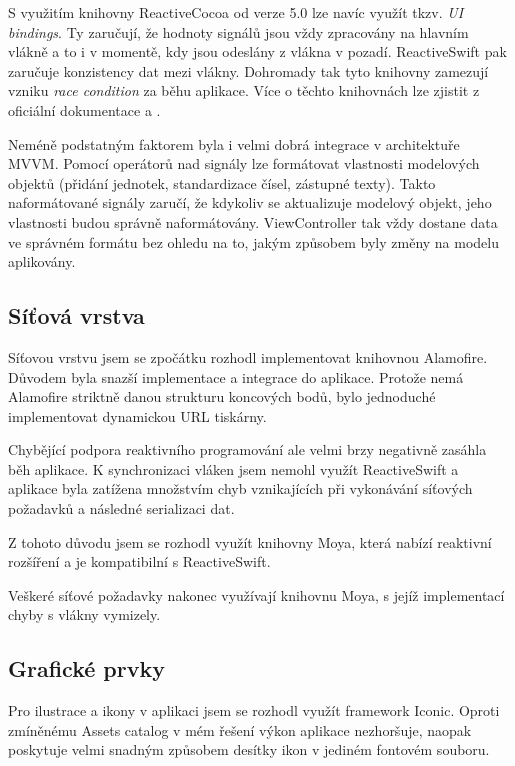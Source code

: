 S využitím knihovny ReactiveCocoa od verze 5.0 lze navíc využít tkzv. \textit{UI bindings}.
Ty zaručují, že hodnoty signálů jsou vždy zpracovány na hlavním vlákně a to i v momentě, kdy jsou odeslány z vlákna v pozadí.
ReactiveSwift pak zaručuje konzistency dat mezi vlákny.
Dohromady tak tyto knihovny zamezují vzniku \textit{race condition} za běhu aplikace.
Více o těchto knihovnách lze zjistit z oficiální dokumentace \cite{github-reactiveswift} a \cite{github-reactivecocoa}.

Neméně podstatným faktorem byla i velmi dobrá integrace v architektuře MVVM.
Pomocí operátorů nad signály lze formátovat vlastnosti modelových objektů (přidání jednotek, standardizace čísel, zástupné texty).
Takto naformátované signály zaručí, že kdykoliv se aktualizuje modelový objekt, jeho vlastnosti budou správně naformátovány.
ViewController tak vždy dostane data ve správném formátu bez ohledu na to, jakým způsobem byly změny na modelu aplikovány.

\subsection{Síťová vrstva}

Síťovou vrstvu jsem se zpočátku rozhodl implementovat knihovnou Alamofire.
Důvodem byla snazší implementace a integrace do aplikace.
Protože nemá Alamofire striktně danou strukturu koncových bodů, bylo jednoduché implementovat dynamickou URL tiskárny.

Chybějící podpora reaktivního programování ale velmi brzy negativně zasáhla běh aplikace.
K synchronizaci vláken jsem nemohl využít ReactiveSwift a aplikace byla zatížena množstvím chyb vznikajících při vykonávání síťových požadavků a následné serializaci dat.

Z tohoto důvodu jsem se rozhodl využít knihovny Moya, která nabízí reaktivní rozšíření a je kompatibilní s ReactiveSwift.

Veškeré síťové požadavky nakonec využívají knihovnu Moya, s jejíž implementací chyby s vlákny vymizely.



\subsection{Grafické prvky}

Pro ilustrace a ikony v aplikaci jsem se rozhodl využít framework Iconic.
Oproti zmíněnému Assets catalog v mém řešení výkon aplikace nezhoršuje, naopak poskytuje velmi snadným způsobem desítky ikon v jediném fontovém souboru.

